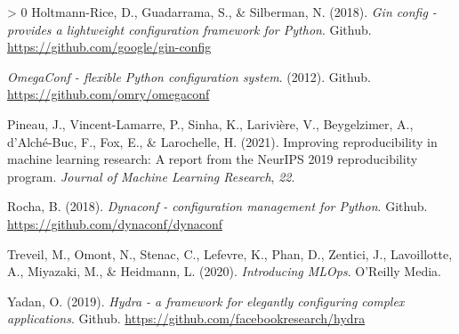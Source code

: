 \documentclass[10pt,a4paper,onecolumn]{article}
\newlength{\cslhangindent}
\newenvironment{CSLReferences}[3] %
 {%
  \setlength{\parindent}{0pt}
  \ifodd #1 \everypar{\setlength{\hangindent}{\cslhangindent}}\ignorespaces\fi
  \ifnum #2 > 0
  \setlength{\parskip}{#2\baselineskip}
  \fi
 }%
 {}
\begin{document}
\begin{CSLReferences}{1}{0}
\leavevmode\hypertarget{ref-ginconfig}{}%
Holtmann-Rice, D., Guadarrama, S., \& Silberman, N. (2018). \emph{Gin
config - provides a lightweight configuration framework for {P}ython}.
Github. \url{https://github.com/google/gin-config}

\leavevmode\hypertarget{ref-omegaconf}{}%
\emph{OmegaConf - flexible {P}ython configuration system}. (2012).
Github. \url{https://github.com/omry/omegaconf}

\leavevmode\hypertarget{ref-pineau2021improving}{}%
Pineau, J., Vincent-Lamarre, P., Sinha, K., Larivière, V., Beygelzimer,
A., d'Alché-Buc, F., Fox, E., \& Larochelle, H. (2021). Improving
reproducibility in machine learning research: A report from the NeurIPS
2019 reproducibility program. \emph{Journal of Machine Learning
Research}, \emph{22}.

\leavevmode\hypertarget{ref-dynaconf}{}%
Rocha, B. (2018). \emph{Dynaconf - configuration management for
{P}ython}. Github. \url{https://github.com/dynaconf/dynaconf}

\leavevmode\hypertarget{ref-treveil2020introducing}{}%
Treveil, M., Omont, N., Stenac, C., Lefevre, K., Phan, D., Zentici, J.,
Lavoillotte, A., Miyazaki, M., \& Heidmann, L. (2020). \emph{Introducing
MLOps}. O'Reilly Media.

\leavevmode\hypertarget{ref-hydra}{}%
Yadan, O. (2019). \emph{Hydra - a framework for elegantly configuring
complex applications}. Github.
\url{https://github.com/facebookresearch/hydra}

\end{CSLReferences}
\end{document}
